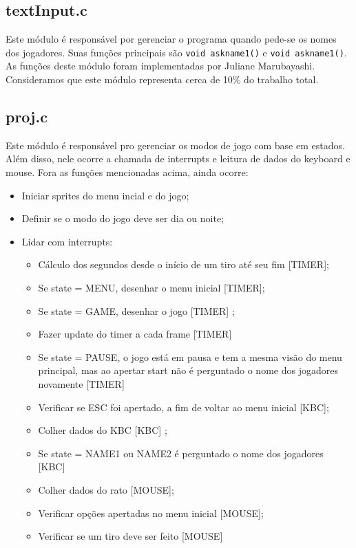 \documentclass[12pt]{article}
\begin{document}
\subsection{textInput.c}
Este módulo é responsável por gerenciar o programa quando pede-se os nomes dos jogadores. \newline
Suas funções principais são \texttt{void askname1()} e \texttt{void askname1()}. \newline
As funções deste módulo foram implementadas por Juliane Marubayashi.  
Consideramos que este módulo representa cerca de 10\% do trabalho total. 
\subsection{proj.c}
Este módulo é responsável pro gerenciar os modos de jogo com base em estados. Além disso, 
nele ocorre a chamada de interrupts e leitura de dados do keyboard e mouse. \newline
Fora as funções mencionadas acima, ainda ocorre: 
\begin{itemize}
    \item Iniciar sprites do menu incial e do jogo;
    \item Definir se o modo do jogo deve ser dia ou noite;
    \item Lidar com interrupts:
    \begin{itemize}
        \item Cálculo dos segundos desde o início de um tiro até seu fim {\color{blue}[TIMER]};
        \item Se state = MENU, desenhar o menu inicial {\color{blue}[TIMER]};
        \item Se state = GAME, desenhar o jogo {\color{blue}[TIMER]} ;
        \item Fazer update do timer a cada frame {\color{blue}[TIMER]}
        \item Se state = PAUSE, o jogo está em pausa e tem a mesma visão do menu principal, mas ao apertar start 
        não é perguntado o nome dos jogadores novamente  {\color{blue}[TIMER]}
        \item Verificar se ESC foi apertado, a fim de voltar ao menu inicial {\color{green}[KBC]};
        \item Colher dados do KBC {\color{green}[KBC]} ;
        \item Se state = NAME1 ou NAME2 é perguntado o nome dos jogadores {\color{green}[KBC]}
        \item Colher dados do rato {\color{red}[MOUSE]};
        \item Verificar opções apertadas no menu inicial {\color{red}[MOUSE]};
        \item Verificar se um tiro deve ser feito {\color{red}[MOUSE]}
    \end{itemize}

\end{itemize}
\end{document}
